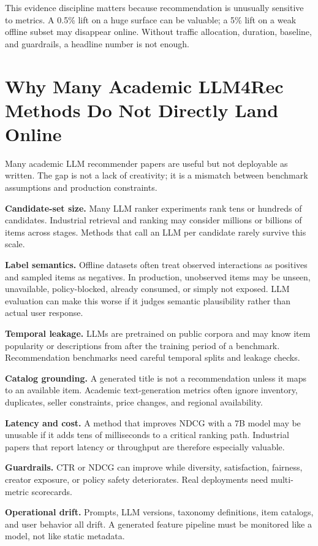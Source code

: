 \documentclass[11pt]{article}
\begin{document}
This evidence discipline matters because recommendation is unusually sensitive to metrics. A 0.5\% lift on a huge surface can be valuable; a 5\% lift on a weak offline subset may disappear online. Without traffic allocation, duration, baseline, and guardrails, a headline number is not enough.

\section{Why Many Academic LLM4Rec Methods Do Not Directly Land Online}

Many academic LLM recommender papers are useful but not deployable as written. The gap is not a lack of creativity; it is a mismatch between benchmark assumptions and production constraints.

\textbf{Candidate-set size.} Many LLM ranker experiments rank tens or hundreds of candidates. Industrial retrieval and ranking may consider millions or billions of items across stages. Methods that call an LLM per candidate rarely survive this scale.

\textbf{Label semantics.} Offline datasets often treat observed interactions as positives and sampled items as negatives. In production, unobserved items may be unseen, unavailable, policy-blocked, already consumed, or simply not exposed. LLM evaluation can make this worse if it judges semantic plausibility rather than actual user response.

\textbf{Temporal leakage.} LLMs are pretrained on public corpora and may know item popularity or descriptions from after the training period of a benchmark. Recommendation benchmarks need careful temporal splits and leakage checks.

\textbf{Catalog grounding.} A generated title is not a recommendation unless it maps to an available item. Academic text-generation metrics often ignore inventory, duplicates, seller constraints, price changes, and regional availability.

\textbf{Latency and cost.} A method that improves NDCG with a 7B model may be unusable if it adds tens of milliseconds to a critical ranking path. Industrial papers that report latency or throughput are therefore especially valuable.

\textbf{Guardrails.} CTR or NDCG can improve while diversity, satisfaction, fairness, creator exposure, or policy safety deteriorates. Real deployments need multi-metric scorecards.

\textbf{Operational drift.} Prompts, LLM versions, taxonomy definitions, item catalogs, and user behavior all drift. A generated feature pipeline must be monitored like a model, not like static metadata.
\end{document}

